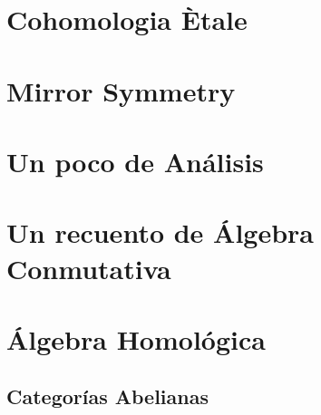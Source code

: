 \documentclass[12pt]{book}
\begin{document}
\chapter{Cohomologia Ètale}





\chapter{Mirror Symmetry}







\appendix

\chapter{Un poco de Análisis}

\chapter{Un recuento de Álgebra Conmutativa}

\chapter{Álgebra Homológica}

\section{Categorías Abelianas}
\end{document}
